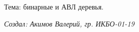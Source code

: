 \label{index_md_README}%
%
Тема\+: бинарные и АВЛ деревья.

{\itshape Создал\+: Акимов Валерий, гр. ИКБО-\/01-\/19} 